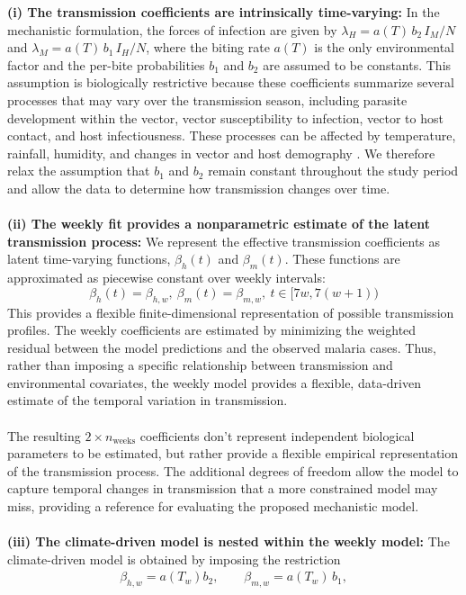 \documentclass[a4paper,fleqn]{cas-dc}
\begin{document}
\textbf{(i) The transmission coefficients are intrinsically time-varying:} In the mechanistic formulation, the forces of infection are given by $\lambda_H = a(T)\,b_2\, I_M/N$ and $\lambda_M = a(T)\,b_1\, I_H/N$, where the biting rate $a(T)$ is the only environmental factor and the per-bite probabilities $b_1$ and $b_2$ are assumed to be constants. This assumption is biologically restrictive because these coefficients summarize several processes that may vary over the transmission season, including parasite development within the vector, vector susceptibility to infection, vector to host contact, and host infectiousness. These processes can be affected by temperature, rainfall, humidity, and changes in vector and host demography \cite{brierre_function_development_rate, human_to_mosquito_transmission_efficiency}. We therefore relax the assumption that $b_1$ and $b_2$ remain constant throughout the study period and allow the data to determine how transmission changes over time.
\\\\
\textbf{(ii) The weekly fit provides a nonparametric estimate of the latent transmission process:} We represent the effective transmission coefficients as latent time-varying functions, $\beta_h(t)$ and $\beta_m(t)$. These functions are approximated as piecewise constant over weekly intervals: $$\beta_h(t)=\beta_{h,w},\ \beta_m(t)=\beta_{m,w},\ t\in[7w,7(w+1))$$
This provides a flexible finite-dimensional representation of possible transmission profiles. The weekly coefficients are estimated by minimizing the weighted residual between the model predictions and the observed malaria cases. Thus, rather than imposing a specific relationship between transmission and environmental covariates, the weekly model provides a flexible, data-driven estimate of the temporal variation in transmission.
\\\\
The resulting $2\times n_{\mathrm{weeks}}$ coefficients don't represent independent biological parameters to be estimated, but rather provide a flexible empirical representation of the transmission process. The additional degrees of freedom allow the model to capture temporal changes in transmission that a more constrained model may miss, providing a reference for evaluating the proposed mechanistic model.
\\\\
\textbf{(iii) The climate-driven model is nested within the weekly model:} The climate-driven model is obtained by imposing the restriction
\begin{align}
\beta_{h,w} = a(T_w) b_2, \qquad \beta_{m,w} = a(T_w)\, b_1,
\label{eq:nested_beta}
\end{align}
\end{document}
